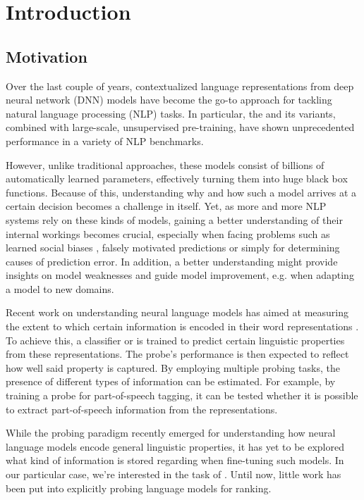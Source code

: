 \chapter{Introduction}
\section{Motivation}
Over the last couple of years, contextualized language representations from deep neural network (DNN) models have become the go-to approach for tackling natural language processing (NLP) tasks. In particular, the  \cite{vaswani2017attention} and its variants, combined with large-scale, unsupervised pre-training, have shown unprecedented performance in a variety of NLP benchmarks.

However, unlike traditional approaches, these models consist of billions of automatically learned parameters, effectively turning them into huge black box functions. Because of this, understanding why and how such a model arrives at a certain decision becomes a challenge in itself. Yet, as more and more NLP systems rely on these kinds of models, gaining a better understanding of their internal workings becomes crucial, especially when facing problems such as learned social biases \cite{Nadeem2021StereoSetMS,Bender2021OnTD, kurita2019measuring}, falsely motivated predictions \cite{10.1145/2939672.2939778, DBLP:journals/corr/abs-1802-00614} or simply for determining causes of prediction error. In addition, a better understanding might provide insights on model weaknesses and guide model improvement, e.g. when adapting a model to new domains.

Recent work on understanding neural language models has aimed at measuring the extent to which certain information is encoded in their word representations \cite{tenney-etal-2019-bert,Tenney2019WhatDY,DBLP:journals/corr/abs-1909-03368}. To achieve this, a  classifier or  is trained to predict certain linguistic properties from these representations. The probe's performance is then expected to reflect how well said property is captured. By employing multiple probing tasks, the presence of different types of information can be estimated. For example, by training a probe for part-of-speech tagging, it can be tested whether it is possible to extract part-of-speech information from the representations.

While the probing paradigm recently emerged for understanding how neural language models encode general linguistic properties, it has yet to be explored what kind of information is stored regarding  when fine-tuning such models. In our particular case, we're interested in the task of . Until now, little work has been put into explicitly probing language models for ranking.

